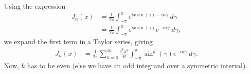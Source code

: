 \documentclass[10pt]{mypackage}
\begin{document}
\begin{solution}[35.4]
  Using the expression
  \begin{align*}
    J_n\left( x \right) &= \frac{1}{2\pi}\int_{-\pi}^{\pi} e^{ix\sin\left( \gamma \right) - in\gamma}\:d\gamma\\
                        &= \frac{1}{2\pi} \int_{-\pi}^{\pi} e^{ix\sin\left( \gamma \right)}e^{-in\gamma}\:d\gamma,
  \end{align*}
  we expand the first term in a Taylor series, giving
  \begin{align*}
    J_n\left( x \right) &= \frac{1}{2\pi}\sum_{k=0}^{\infty} \frac{i^{k}x^{k}}{k!} \int_{-\pi}^{\pi} \sin^{k}\left( \gamma \right)e^{-in\gamma}\:d\gamma.
  \end{align*}
  Now, $k$ has to be even (else we have an odd integrand over a symmetric interval).
\end{solution}
\end{document}
